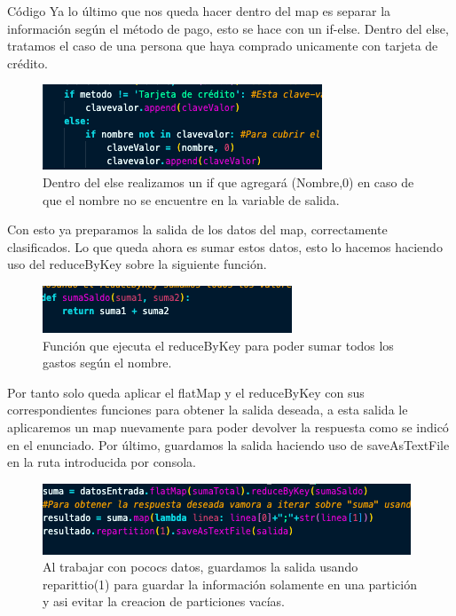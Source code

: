 \documentclass[a4paper]{article}
\begin{document}
\begin{section}{Código}
    Ya lo último que nos queda hacer dentro del map es separar la información según el método de pago, esto se hace con un if-else. Dentro del else, tratamos el caso de una persona que haya comprado unicamente con tarjeta de crédito.
    \begin{figure}[h]
        \centering
        \includegraphics[width=\textwidth, keepaspectratio]{codigo3}
        \caption{Dentro del else realizamos un if que agregará (Nombre,0) en caso de que el nombre no se encuentre en la variable de salida.}
    \end{figure}
    Con esto ya preparamos la salida de los datos del map, correctamente clasificados. Lo que queda ahora es sumar estos datos, esto lo hacemos haciendo uso del reduceByKey sobre la siguiente función.
    \begin{figure}[h]
        \centering
        \includegraphics[width=\textwidth, keepaspectratio]{codigo4}
        \caption{Función que ejecuta el reduceByKey para poder sumar todos los gastos según el nombre.}
    \end{figure}
    Por tanto solo queda aplicar el flatMap y el reduceByKey con sus correspondientes funciones para obtener la salida deseada, a esta salida le aplicaremos un map nuevamente para poder devolver la respuesta como se indicó en el enunciado. Por último, guardamos la salida haciendo uso de saveAsTextFile en la ruta introducida por consola.


    \begin{figure}[h]
        \centering
        \includegraphics[width=\textwidth, keepaspectratio]{codigo5}
        \caption{Al trabajar con pococs datos, guardamos la salida usando reparittio(1) para guardar la información solamente en una partición y asi evitar la creacion de particiones vacías.}

    \end{figure}
\end{section}
\end{document}
